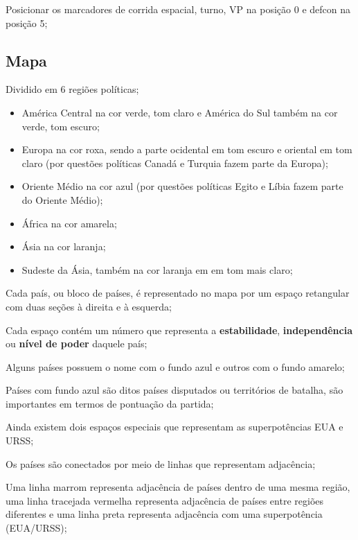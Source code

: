 \documentclass[11pt]{article}
\begin{document}
Posicionar os marcadores de corrida espacial, turno, VP na posição 0 e defcon na posição 5;

\subsection{Mapa}
\label{sec:org320d4ca}

Dividido em 6 regiões políticas;

\begin{itemize}
\item América Central na cor verde, tom claro e América do Sul também na cor verde, tom escuro;

\item Europa na cor roxa, sendo a parte ocidental em tom escuro e oriental em tom claro (por questões políticas Canadá e Turquia fazem parte da Europa);

\item Oriente Médio na cor azul (por questões políticas Egito e Líbia fazem parte do Oriente Médio);

\item África na cor amarela;

\item Ásia na cor laranja;

\item Sudeste da Ásia, também na cor laranja em em tom mais claro;
\end{itemize}

Cada país, ou bloco de países, é representado no mapa por um espaço retangular com duas seções à direita e à esquerda;

Cada espaço contém um número que representa a \textbf{estabilidade}, \textbf{independência} ou \textbf{nível de poder} daquele país;

Alguns países possuem o nome com o fundo azul e outros com o fundo amarelo;

Países com fundo azul são ditos países disputados ou territórios de batalha, são importantes em termos de pontuação da partida;

Ainda existem dois espaços especiais que representam as superpotências EUA e URSS;

Os países são conectados por meio de linhas que representam adjacência;

Uma linha marrom representa adjacência de países dentro de uma mesma região, uma linha tracejada vermelha representa adjacência de países entre regiões diferentes e uma linha preta representa adjacência com uma superpotência (EUA/URSS);
\end{document}
